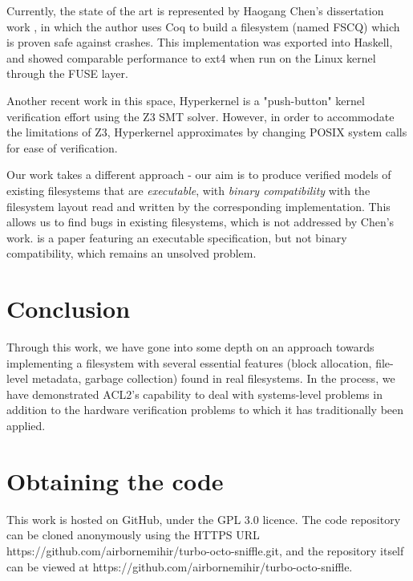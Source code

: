 \documentclass[format=sigconf,review=true]{acmart}
\begin{document}
Currently, the state of the art is represented by Haogang
Chen's dissertation work \cite{DBLP:conf/usenix/ChenZCCKZ16}, in which
the author uses Coq to build a filesystem (named FSCQ) which is proven
safe against crashes. This implementation was exported into Haskell,
and showed comparable performance to ext4 when run on the Linux kernel
through the FUSE layer.

Another recent work in this space, Hyperkernel
\cite{Nelson:2017:HPV:3132747.3132748} is a "push-button" kernel verification
effort using the Z3 SMT solver. However, in order to accommodate the
limitations of Z3, Hyperkernel approximates by changing POSIX system
calls for ease of verification.

Our work takes a different approach - our aim is to produce verified
models of existing filesystems that are \textit{executable}, with
\textit{binary compatibility} with the filesystem layout read and
written by the corresponding implementation. This allows us to find
bugs in existing filesystems, which is not addressed by Chen's
work. \cite{ridge2015sibylfs} is a paper featuring an executable
specification, but not binary compatibility, which remains an unsolved
problem.

\section{Conclusion}
Through this work, we have gone into some depth on an approach towards
implementing a filesystem with several essential features (block
allocation, file-level metadata, garbage collection) found in real
filesystems. In the process, we have demonstrated ACL2's capability to
deal with systems-level problems in addition to the hardware
verification problems to which it has traditionally been applied.

\section{Obtaining the code}
This work is hosted on GitHub, under the GPL 3.0 licence. The code
repository can be cloned anonymously using the HTTPS URL
https://github.com/airbornemihir/turbo-octo-sniffle.git, and the
repository itself can be viewed at
https://github.com/airbornemihir/turbo-octo-sniffle.



\end{document}
